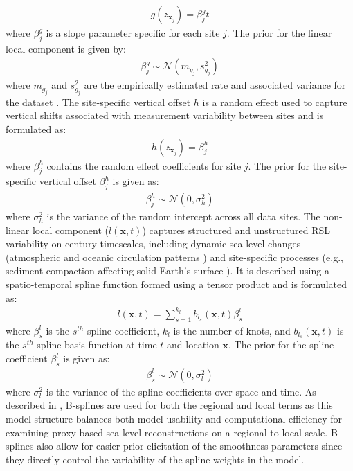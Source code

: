 \begin{align}
g(z_{\mathbf{x}_j}) = \beta^{g}_jt
\end{align}
where \(\beta^{g}_j\) is a slope parameter specific for each site \(j\). The prior for the linear local component is given by:
\begin{align}
\beta_j^g \sim \mathcal{N} (m_{g_j}, s^2_{g_j})
\end{align}
where \(m_{g_j}\) and \(s^2_{g_j}\) are the empirically estimated rate and associated variance for the dataset \citep[refer to][ for a detailed description]{Upton2023noisy}.
The site-specific vertical offset \(h\) is a random effect used to capture vertical shifts associated with measurement variability between sites and is formulated as:
\begin{align}
h(z_{\mathbf{x}_j}) = \beta^{h}_j
 \end{align}
where \(\beta^{h}_j\) contains the random effect coefficients for site \(j\). The prior for the site-specific vertical offset \(\beta^{h}_j\) is given as:
\begin{align}
\beta^{h}_j \sim \mathcal{N}(0, \sigma_h^2)
\end{align}
where \(\sigma_h^2\) is the variance of the random intercept across all data sites.
The non-linear local component (\(l(\mathbf{x}, t)\)) captures structured and unstructured RSL variability on century timescales, including dynamic sea-level changes (atmospheric and oceanic circulation patterns \citep{Gregory2019}) and site-specific processes (e.g., sediment compaction affecting solid Earth's surface \citep{Horton2018}). It is described using a spatio-temporal spline function formed using a tensor product and is formulated as:
\begin{align}
  l(\mathbf{x}, t) = \sum_{s=1}^{k_l} b_{l_s}(\mathbf{x},t) \beta^{l}_s
\end{align}
where \(\beta^{l}_s\) is the \(s^{th}\) spline coefficient, \(k_l\) is the number of knots, and \(b_{l_s}(\mathbf{x},t)\) is the \(s^{th}\) spline basis function at time \(t\) and location \(\mathbf{x}\). The prior for the spline coefficient \(\beta^{l}_s\) is given as:
\begin{align}
\beta^{l}_s \sim \mathcal{N}(0,\sigma_l^2)
\end{align}
where \(\sigma_l^2\) is the variance of the spline coefficients over space and time.
As described in \citet{Upton2023noisy}, B-splines are used for both the regional and local terms as this model structure balances both model usability and computational efficiency for examining proxy-based sea level reconstructions on a regional to local scale. B-splines also allow for easier prior elicitation of the smoothness parameters since they directly control the variability of the spline weights in the model.
